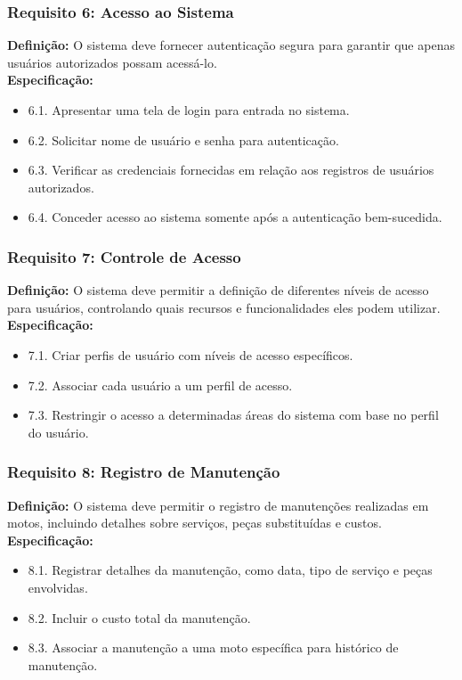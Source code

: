 \subsubsection{Requisito 6: Acesso ao Sistema}
\textbf{Definição:} O sistema deve fornecer autenticação segura para garantir que apenas usuários autorizados possam acessá-lo.
\\
\textbf{Especificação:}
\begin{itemize}
	\item 6.1. Apresentar uma tela de login para entrada no sistema.
	\item 6.2. Solicitar nome de usuário e senha para autenticação.
	\item 6.3. Verificar as credenciais fornecidas em relação aos registros de usuários autorizados.
	\item 6.4. Conceder acesso ao sistema somente após a autenticação bem-sucedida.
\end{itemize}

\subsubsection{Requisito 7: Controle de Acesso}
\textbf{Definição:} O sistema deve permitir a definição de diferentes níveis de acesso para usuários, controlando quais recursos e funcionalidades eles podem utilizar.
\\
\textbf{Especificação:}
\begin{itemize}
	\item 7.1. Criar perfis de usuário com níveis de acesso específicos.
	\item 7.2. Associar cada usuário a um perfil de acesso.
	\item 7.3. Restringir o acesso a determinadas áreas do sistema com base no perfil do usuário.
\end{itemize}

\subsubsection{Requisito 8: Registro de Manutenção}
\textbf{Definição:} O sistema deve permitir o registro de manutenções realizadas em motos, incluindo detalhes sobre serviços, peças substituídas e custos.
\\
\textbf{Especificação:}
\begin{itemize}
	\item 8.1. Registrar detalhes da manutenção, como data, tipo de serviço e peças envolvidas.
	\item 8.2. Incluir o custo total da manutenção.
	\item 8.3. Associar a manutenção a uma moto específica para histórico de manutenção.
\end{itemize}

